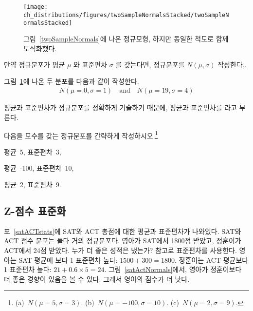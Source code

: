 \begin{figure}[hht]
\centering
\texttt{[image: ch\_distributions/figures/twoSampleNormalsStacked/twoSampleNormalsStacked]}
\caption{그림~\ref{twoSampleNormals}에 나온 정규모형, 하지만 동일한 척도로 함께 도식화했다.}
\label{twoSampleNormalsStacked}
\end{figure}

만약 정규분포가 평균 $\mu$ 와 표준편차 $\sigma$ 를 갖는다면, 정규분포를 $N(\mu, \sigma)$ 작성한다..

그림~\ref{twoSampleNormalsStacked}에 나온 두 분포를 다음과 같이 작성한다.
\begin{align*}
N(\mu=0,\sigma=1)\quad\text{and}\quad N(\mu=19,\sigma=4)
\end{align*}

평균과 표준편차가 정규분포를 정확하게 기술하기 때문에, 평균과 표준편차를 라고 부른다.

\begin{exercise}

다음을 모수를 갖는 정규분포를 간략하게 작성하시오.\footnote{(a)~$N(\mu=5,\sigma=3)$. (b)~$N(\mu=-100, \sigma=10)$. (c)~$N(\mu=2, \sigma=9)$.}
\begin{parts}
\item 평균~5, 표준편차~3,
\item 평균~-100, 표준편차~10, 
\item 평균~2, 표준편차~9.
\end{parts}
\end{exercise}

\subsection{Z-점수 표준화}

\begin{example}{
표~\vref{satACTstats}에 SAT와 ACT 총점에 대한 평균과 표준편차가 나와있다.
SAT와 ACT 점수 분포는 둘다 거의 정규분포다. 영아가 SAT에서 1800점 받았고, 정훈이가 ACT에서 24점 받았다. 누가 더 좋은 성적은 냈는가?}\label{actSAT}
참고로 표준편차를 사용한다. 영아는 SAT 평균에 보다 1 표준편차 높다: $1500 + 300=1800$. 정훈이는 ACT 평균보다 1 표준편차 높다: $21+0.6\times 5=24$. 그림~\ref{satActNormals}에서, 영아가 정훈이보다 더 좋은 경향이 있음을 볼 수 있다. 그래서 영아의 점수가 더 낫다.
\end{example}

